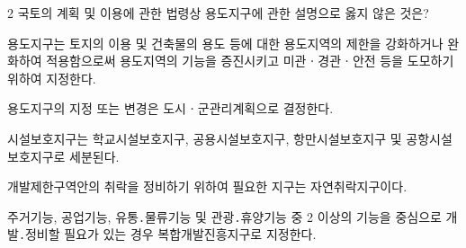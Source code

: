 \begin{question}{2}
국토의 계획 및 이용에 관한 법령상 용도지구에 관한 설명으로 옳지 않은 것은?
\begin{choices}
  \item 용도지구는 토지의 이용 및 건축물의 용도 등에 대한 용도지역의 제한을 강화하거나 완화하여 적용함으로써 용도지역의 기능을 증진시키고 미관ㆍ경관ㆍ안전 등을 도모하기 위하여 지정한다.
  \item 용도지구의 지정 또는 변경은 도시ㆍ군관리계획으로 결정한다.
  \item 시설보호지구는 학교시설보호지구, 공용시설보호지구, 항만시설보호지구 및 공항시설보호지구로 세분된다.
  \item 개발제한구역안의 취락을 정비하기 위하여 필요한 지구는 자연취락지구이다.
  \item 주거기능, 공업기능, 유통․물류기능 및 관광․휴양기능 중 2 이상의 기능을 중심으로 개발․정비할 필요가 있는 경우 복합개발진흥지구로 지정한다.
\end{choices}
\end{question}
